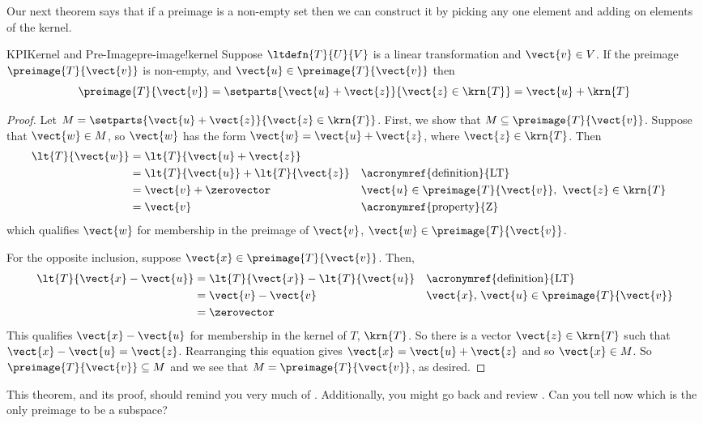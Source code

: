 %
Our next theorem says that if a preimage is a non-empty set then we can construct it by picking any one element and adding on elements of the kernel.
%
\begin{theorem}{KPI}{Kernel and Pre-Image}{pre-image!kernel}
Suppose $\ltdefn{T}{U}{V}$ is a linear transformation and $\vect{v}\in V$.  If the preimage $\preimage{T}{\vect{v}}$ is non-empty, and $\vect{u}\in\preimage{T}{\vect{v}}$  then
%
\begin{equation*}
\preimage{T}{\vect{v}}=
\setparts{\vect{u}+\vect{z}}{\vect{z}\in\krn{T}}
=\vect{u}+\krn{T}
\end{equation*}
%
\end{theorem}
%
\begin{proof}
Let $M=\setparts{\vect{u}+\vect{z}}{\vect{z}\in\krn{T}}$.  First, we show that $M\subseteq\preimage{T}{\vect{v}}$.  Suppose that $\vect{w}\in M$, so $\vect{w}$ has the form $\vect{w}=\vect{u}+\vect{z}$, where $\vect{z}\in\krn{T}$.  Then
%
\begin{align*}
\lt{T}{\vect{w}}&=\lt{T}{\vect{u}+\vect{z}}\\
&=\lt{T}{\vect{u}}+\lt{T}{\vect{z}}&&\text{\acronymref{definition}{LT}}\\
&=\vect{v}+\zerovector&&\vect{u}\in\preimage{T}{\vect{v}},\ \vect{z}\in\krn{T}\\
&=\vect{v}&&\text{\acronymref{property}{Z}}
\end{align*}
%
which qualifies $\vect{w}$ for membership in the preimage of $\vect{v}$, $\vect{w}\in\preimage{T}{\vect{v}}$.\par
%
For the opposite inclusion, suppose $\vect{x}\in\preimage{T}{\vect{v}}$.  Then,
%
\begin{align*}
\lt{T}{\vect{x}-\vect{u}}&=\lt{T}{\vect{x}}-\lt{T}{\vect{u}}&&\text{\acronymref{definition}{LT}}\\
&=\vect{v}-\vect{v}&&\vect{x},\,\vect{u}\in\preimage{T}{\vect{v}}\\
&=\zerovector
\end{align*}
%
This qualifies $\vect{x}-\vect{u}$ for membership in the kernel of $T$, $\krn{T}$.  So there is a vector $\vect{z}\in\krn{T}$ such that $\vect{x}-\vect{u}=\vect{z}$.  Rearranging this equation gives $\vect{x}=\vect{u}+\vect{z}$ and so $\vect{x}\in M$.  So $\preimage{T}{\vect{v}}\subseteq M$ and we see that $M=\preimage{T}{\vect{v}}$, as desired.
%
\end{proof}
%
This theorem, and its proof, should remind you very much of .  Additionally, you might go back and review .  Can you tell now which is the only preimage to be a subspace?\par
